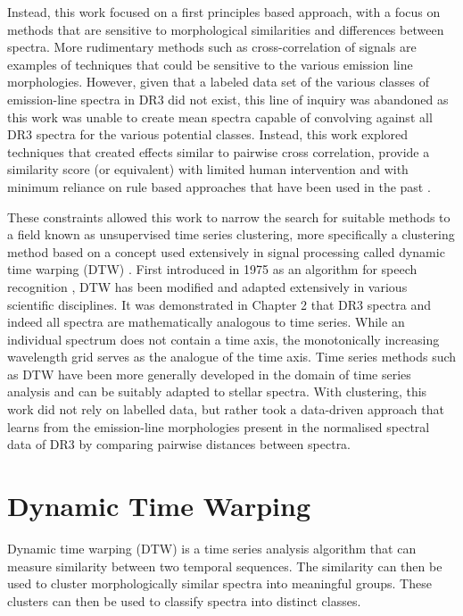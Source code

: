 Instead, this work focused on a first principles based approach, with a focus on methods that are sensitive to morphological similarities and differences between spectra. More rudimentary methods such as cross-correlation of signals are examples of techniques that could be sensitive to the various emission line morphologies. However, given that a labeled data set of the various classes of emission-line spectra in DR3 did not exist, this line of inquiry was abandoned as this work was unable to create mean spectra capable of convolving against all DR3 spectra for the various potential classes. Instead, this work explored techniques that created effects similar to pairwise cross correlation, provide a similarity score (or equivalent) with limited human intervention and with minimum reliance on rule based approaches that have been used in the past \cite{traven2015gaia}. 

These constraints allowed this work to narrow the search for suitable methods to a field known as unsupervised time series clustering, more specifically a clustering method based on a concept used extensively in signal processing called dynamic time warping (DTW) \cite{kruskal1983overview}. First introduced in 1975 as an algorithm for speech recognition \cite{itakura1975minimum}, DTW has been modified and adapted extensively in various scientific disciplines. It was demonstrated in Chapter 2 that DR3 spectra and indeed all spectra are mathematically analogous to time series. While an individual spectrum does not contain a time axis, the monotonically increasing wavelength grid serves as the analogue of the time axis. Time series methods such as DTW have been more generally developed in the domain of time series analysis \cite{nielsen2019practical} and can be suitably adapted to stellar spectra. With clustering, this work did not rely on labelled data, but rather took a data-driven approach that learns from the emission-line morphologies present in the normalised spectral data of DR3 by comparing pairwise distances between spectra.

\section{Dynamic Time Warping}

Dynamic time warping (DTW) is a time series analysis algorithm that can measure similarity between two temporal sequences. The similarity can then be used to cluster morphologically similar spectra into meaningful groups. These clusters can then be used to classify spectra into distinct classes. 

